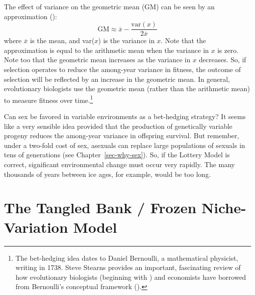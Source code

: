 \documentclass[
  letterpaper,
]{book}
\begin{document}
The effect of variance on the geometric mean (GM) can be seen by an
approximation ():\[\text{GM} \approx \overline{x} - \frac{\text{var}(x)}{2\overline{x}}\]
where \(\overline{x}\) is the mean, and var(\(x\)) is the variance in
\(x\). Note that the approximation is equal to the arithmetic mean when
the variance in \(x\) is zero. Note too that the geometric mean
increases as the variance in \(x\) decreases. So, if selection operates
to reduce the among-year variance in fitness, the outcome of selection
will be reflected by an increase in the geometric mean. In general,
evolutionary biologists use the geometric mean (rather than the
arithmetic mean) to measure fitness over time.\footnote{The bet-hedging
  idea dates to Daniel Bernoulli, a mathematical physicist, writing in
  1738. Steve Stearns provides an important, fascinating review of how
  evolutionary biologists (beginning with
  ) and economists have borrowed
  from Bernoulli's conceptual framework
  ().}

Can sex be favored in variable environments as a bet-hedging strategy?
It seems like a very sensible idea provided that the production of
genetically variable progeny reduces the among-year variance in
offspring survival. But remember, under a two-fold cost of sex, asexuals
can replace large populations of sexuals in tens of generations (see
Chapter~\ref{sec-why-sex}). So, if the Lottery Model is correct,
significant environmental change must occur very rapidly. The many
thousands of years between ice ages, for example, would be too long.

\section{The Tangled Bank / Frozen Niche-Variation
Model}\label{sec-niche}
\end{document}

